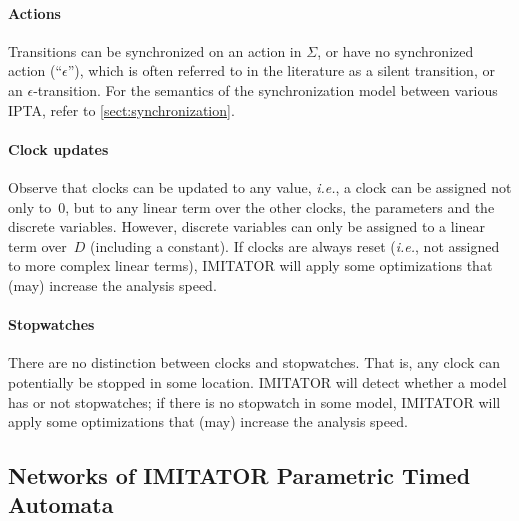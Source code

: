 \documentclass[a4paper,11pt]{report}
\makeatletter
\newcommand{\Action}{\ensuremath{\Sigma}}
\newcommand{\DVar}{D} %
\newcommand{\unobs}{\ensuremath{\epsilon}}
\newcommand{\imitator}{\textsf{IMITATOR}}
\newcommand{\IPTA}{IPTA}
\newcommand{\ie}{\textcolor{colorok}{\textit{i.e.},\@}}
\makeatother
\begin{document}
\paragraph{Actions}
Transitions can be synchronized on an action in $\Action$, or have no synchronized action (``$\unobs$''), which is often referred to in the literature as a silent transition, or an $\epsilon$-transition.
For the semantics of the synchronization model between various \IPTA{}, refer to \cref{sect:synchronization}.

\paragraph{Clock updates}
Observe that clocks can be updated to any value, \ie{} a clock can be assigned not only to~0, but to any linear term over the other clocks, the parameters and the discrete variables.
However, discrete variables can only be assigned to a linear term over~$\DVar$ (including a constant).
If clocks are always reset (\ie{} not assigned to more complex linear terms), \imitator{} will apply some optimizations that (may) increase the analysis speed.

\paragraph{Stopwatches}
There are no distinction between clocks and stopwatches.
That is, any clock can potentially be stopped in some location.
\imitator{} will detect whether a model has or not stopwatches; if there is no stopwatch in some model, \imitator{} will apply some optimizations that (may) increase the analysis speed.


\subsection{Networks of \imitator{} Parametric Timed Automata}
\end{document}
